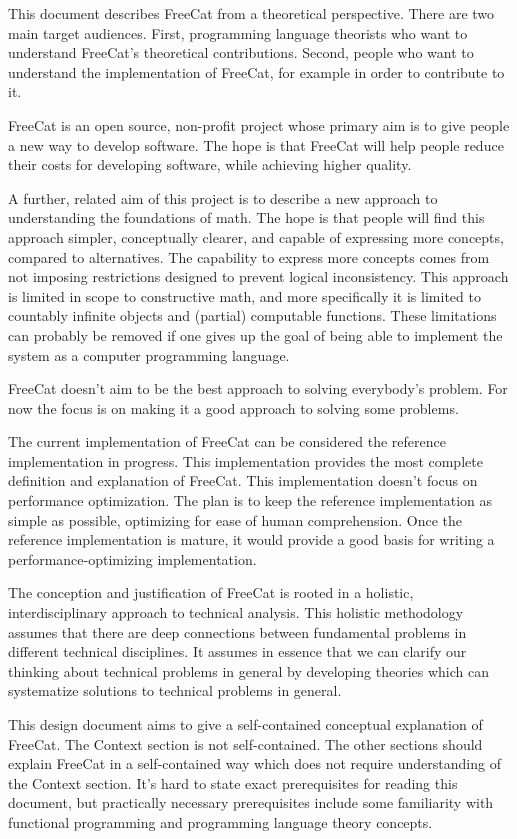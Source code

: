 \documentclass{article}
\begin{document}
This document describes FreeCat from a theoretical perspective. There are two main target audiences. First, programming language theorists who want to understand FreeCat's theoretical contributions. Second, people who want to understand the implementation of FreeCat, for example in order to contribute to it.

FreeCat is an open source, non-profit project whose primary aim is to give people a new way to develop software. The hope is that FreeCat will help people reduce their costs for developing software, while achieving higher quality.

A further, related aim of this project is to describe a new approach to understanding the foundations of math. The hope is that people will find this approach simpler, conceptually clearer, and capable of expressing more concepts, compared to alternatives. The capability to express more concepts comes from not imposing restrictions designed to prevent logical inconsistency. This approach is limited in scope to constructive math, and more specifically it is limited to countably infinite objects and (partial) computable functions. These limitations can probably be removed if one gives up the goal of being able to implement the system as a computer programming language.

FreeCat doesn't aim to be the best approach to solving everybody's problem. For now the focus is on making it a good approach to solving some problems.

The current implementation of FreeCat can be considered the reference implementation in progress. This implementation provides the most complete definition and explanation of FreeCat. This implementation doesn't focus on performance optimization. The plan is to keep the reference implementation as simple as possible, optimizing for ease of human comprehension. Once the reference implementation is mature, it would provide a good basis for writing a performance-optimizing implementation.

The conception and justification of FreeCat is rooted in a holistic, interdisciplinary approach to technical analysis. This holistic methodology assumes that there are deep connections between fundamental problems in different technical disciplines. It assumes in essence that we can clarify our thinking about technical problems in general by developing theories which can systematize solutions to technical problems in general.

This design document aims to give a self-contained conceptual explanation of FreeCat. The Context section is not self-contained. The other sections should explain FreeCat in a self-contained way which does not require understanding of the Context section. It's hard to state exact prerequisites for reading this document, but practically necessary prerequisites include some familiarity with functional programming and programming language theory concepts.
\end{document}
